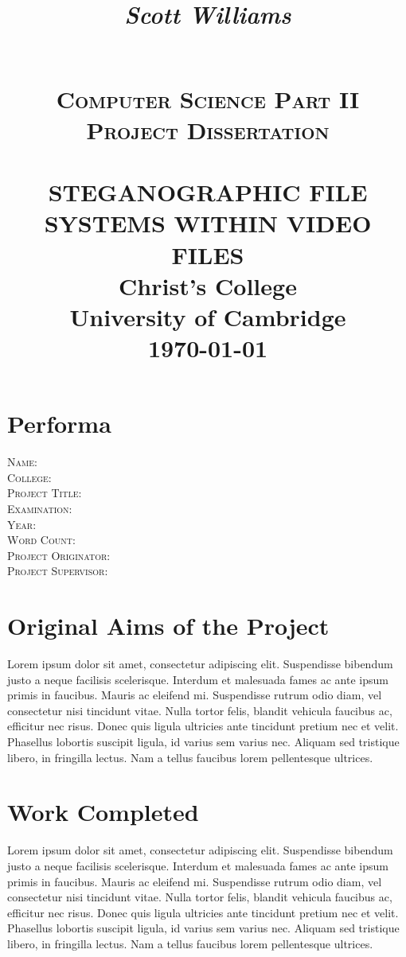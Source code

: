 \documentclass[paper=a4, fontsize=11pt,twoside]{scrartcl}    %
\title{    \begin{flushright}
				\LARGE{\textit{Scott Williams}}
			\end{flushright}
			~\\[2.0cm]			
			\normalsize \textsc{Computer Science Part II Project Dissertation}     %
             \\[2.0cm]                                %
            \HRule{0.5pt} \\                        %
            \LARGE \textbf{\uppercase{Steganographic file systems within video files}}    %
            \HRule{2pt} \\ [30pt]        %
            \normalsize Christ's College\\[5pt]University of Cambridge\\[25pt]           
            \normalsize \today            %
        }
\makeatletter
\def\printtitle{%
    {\centering \@title\par}}
\def\printauthor{%
    {\large \@author}}
\makeatother
\begin{document}
\thispagestyle{empty}        %

\printtitle                    %
      \vfill
\printauthor                %
\newpage
\setcounter{page}{1}        %
\section*{Performa}
\textsc{Name}: \\
\textsc{College}: \\
\textsc{Project Title}: \\
\textsc{Examination}: \\
\textsc{Year}: \\
\textsc{Word Count}: \\
\textsc{Project Originator}: \\
\textsc{Project Supervisor}: \\

\section*{Original Aims of the Project}
Lorem ipsum dolor sit amet, consectetur adipiscing elit. Suspendisse bibendum justo a neque facilisis scelerisque. Interdum et malesuada fames ac ante ipsum primis in faucibus. Mauris ac eleifend mi. Suspendisse rutrum odio diam, vel consectetur nisi tincidunt vitae. Nulla tortor felis, blandit vehicula faucibus ac, efficitur nec risus. Donec quis ligula ultricies ante tincidunt pretium nec et velit. Phasellus lobortis suscipit ligula, id varius sem varius nec. Aliquam sed tristique libero, in fringilla lectus. Nam a tellus faucibus lorem pellentesque ultrices. 

\section*{Work Completed}
Lorem ipsum dolor sit amet, consectetur adipiscing elit. Suspendisse bibendum justo a neque facilisis scelerisque. Interdum et malesuada fames ac ante ipsum primis in faucibus. Mauris ac eleifend mi. Suspendisse rutrum odio diam, vel consectetur nisi tincidunt vitae. Nulla tortor felis, blandit vehicula faucibus ac, efficitur nec risus. Donec quis ligula ultricies ante tincidunt pretium nec et velit. Phasellus lobortis suscipit ligula, id varius sem varius nec. Aliquam sed tristique libero, in fringilla lectus. Nam a tellus faucibus lorem pellentesque ultrices. 
\end{document}
